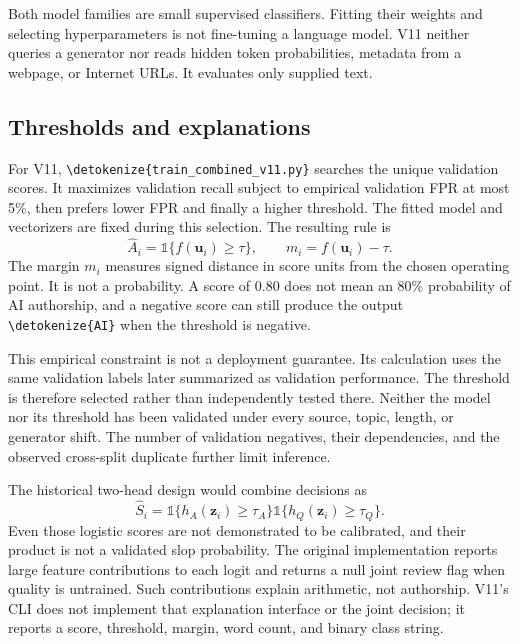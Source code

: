 \documentclass[11pt]{article}
\newcommand{\code}[1]{\expandafter\nolinkurl\expandafter{\detokenize{#1}}}
\begin{document}
Both model families are small supervised classifiers. Fitting their weights
and selecting hyperparameters is not fine-tuning a language model. V11 neither
queries a generator nor reads hidden token probabilities, metadata from a
webpage, or Internet URLs. It evaluates only supplied text.

\subsection{Thresholds and explanations}
For V11, \code{train_combined_v11.py} searches the unique validation scores.
It maximizes validation recall subject to empirical validation FPR at most
5\%, then prefers lower FPR and finally a higher threshold. The fitted model
and vectorizers are fixed during this selection. The resulting rule is
\begin{equation}
\widehat A_i=\mathbb{1}\{f(\mathbf u_i)\geq\tau\},
\qquad m_i=f(\mathbf u_i)-\tau.
\label{eq:decision}
\end{equation}
The margin $m_i$ measures signed distance in score units from the chosen
operating point. It is not a probability. A score of 0.80 does not mean an
80\% probability of AI authorship, and a negative score can still produce
the output \code{AI} when the threshold is negative.

This empirical constraint is not a deployment guarantee. Its calculation
uses the same validation labels later summarized as validation performance.
The threshold is therefore selected rather than independently tested there.
Neither the model nor its threshold has been validated under every source,
topic, length, or generator shift. The number of validation negatives, their
dependencies, and the observed cross-split duplicate further limit inference.

The historical two-head design would combine decisions as
\begin{equation}
\widehat S_i=\mathbb{1}\{h_A(\mathbf z_i)\geq\tau_A\}
\mathbb{1}\{h_Q(\mathbf z_i)\geq\tau_Q\}.
\end{equation}
Even those logistic scores are not demonstrated to be calibrated, and their
product is not a validated slop probability. The original implementation
reports large feature contributions to each logit and returns a null joint
review flag when quality is untrained. Such contributions explain arithmetic,
not authorship. V11's CLI does not implement that explanation interface or
the joint decision; it reports a score, threshold, margin, word count, and
binary class string.
\end{document}
